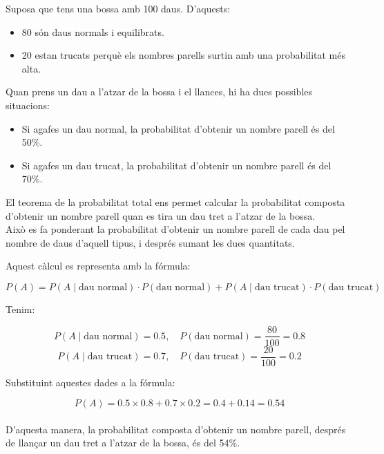 \documentclass[12pt]{article}
\begin{document}
\begin{exemple}  [title=Exemple 1]  \noindent Suposa que tens una bossa amb 100 daus. D'aquests:

\begin{itemize}
    \item 80 són daus normals i equilibrats.
    \item 20 estan trucats perquè els nombres parells surtin amb una probabilitat més alta.
\end{itemize}

Quan prens un dau a l'atzar de la bossa i el llances, hi ha dues possibles situacions:

\begin{itemize}
    \item Si agafes un dau normal, la probabilitat d'obtenir un nombre parell és del 50\%.
    \item Si agafes un dau trucat, la probabilitat d'obtenir un nombre parell és del 70\%.
\end{itemize}

El teorema de la probabilitat total ens permet calcular la probabilitat composta d'obtenir un nombre parell quan es tira un dau tret a l'atzar de la bossa. \\

Això es fa ponderant la probabilitat d'obtenir un nombre parell de cada dau pel nombre de daus d'aquell tipus, i després sumant les dues quantitats.

\end{exemple}

\begin{exemple} \noindent Aquest càlcul es representa amb la fórmula:

\[
P(A) = P(A \mid \text{dau normal}) \cdot P(\text{dau normal}) + P(A \mid \text{dau trucat}) \cdot P(\text{dau trucat})
\]

Tenim:

\[
P(A \mid \text{dau normal}) = 0.5, \quad P(\text{dau normal}) = \frac{80}{100} = 0.8
\]
\[
P(A \mid \text{dau trucat}) = 0.7, \quad P(\text{dau trucat}) = \frac{20}{100} = 0.2
\]

Substituint aquestes dades a la fórmula:

\[
P(A) = 0.5 \times 0.8 + 0.7 \times 0.2 = 0.4 + 0.14 = 0.54
\]\\

D'aquesta manera, la probabilitat composta d'obtenir un nombre parell, després de llançar un dau tret a l'atzar de la bossa, és del 54\%.
\end{exemple}
\end{document}
